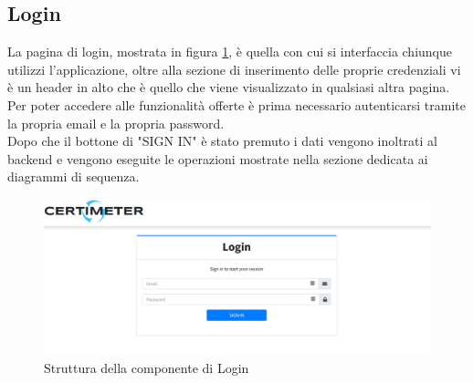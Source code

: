 \subsection{Login}
La pagina di login, mostrata in figura \ref{fig:loginPage}, è quella con cui si interfaccia chiunque utilizzi l'applicazione, oltre alla sezione di inserimento delle proprie credenziali vi è un header in alto che è quello che viene visualizzato in qualsiasi altra pagina.
\\
Per poter accedere alle funzionalità offerte è prima necessario autenticarsi tramite la propria email e la propria password.
\\
Dopo che il bottone di "SIGN IN" è stato premuto i dati vengono inoltrati al backend e vengono eseguite le operazioni mostrate nella sezione dedicata ai diagrammi di sequenza.

\begin{figure}[h]
    \centering
    \includegraphics[width=450px]{./images/login_component.png}
    \caption{Struttura della componente di Login}
    \label{fig:loginPage}
\end{figure}

